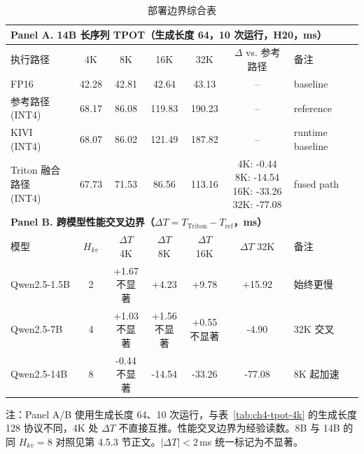 \begin{table}[H]
  \centering
  \caption{部署边界综合表}
  \label{tab:ch4-deployment-boundary}
  {%
	  \scriptsize
	  \setlength{\tabcolsep}{3.0pt}
	  \renewcommand{\arraystretch}{1.14}
		  \begin{tabular*}{\linewidth}{@{\extracolsep{\fill}}lcccccl@{}}
	    \toprule
	    \multicolumn{7}{l}{\textbf{Panel A. 14B 长序列 TPOT（生成长度 64，10 次运行，H20，ms）}} \\
	    \midrule
		    执行路径 & 4K & 8K & 16K & 32K & \makecell[c]{$\Delta$ vs.\\参考路径} & 备注 \\
	    \midrule
		    FP16             & 42.28 & 42.81 & 42.64 & 43.13 & -- & baseline \\
		    \makecell[l]{参考路径\\(INT4)} & 68.17 & 86.08 & 119.83 & 190.23 & -- & reference \\
		    \makecell[l]{KIVI\\(INT4)} & 68.07 & 86.02 & 121.49 & 187.82 & -- & runtime baseline \\
		    \makecell[l]{Triton 融合路径\\(INT4)} & 67.73 & 71.53 & 86.56 & 113.16 & \makecell[c]{4K: -0.44\\8K: -14.54\\16K: -33.26\\32K: -77.08} & fused path \\
	    \midrule
		    \multicolumn{7}{l}{\textbf{Panel B. 跨模型性能交叉边界（$\Delta T=T_{\mathrm{Triton}}-T_{\mathrm{ref}}$，ms）}} \\
	    \midrule
	    模型 & $H_{kv}$ & \makecell[c]{$\Delta T$\\4K} & \makecell[c]{$\Delta T$\\8K} & \makecell[c]{$\Delta T$\\16K} & \makecell[c]{$\Delta T$\\32K} & 备注 \\
    \midrule
    Qwen2.5-1.5B & 2 & \makecell[c]{+1.67\\不显著} & +4.23 & +9.78 & +15.92 & 始终更慢 \\
    Qwen2.5-7B   & 4 & \makecell[c]{+1.03\\不显著} & \makecell[c]{+1.56\\不显著} & \makecell[c]{+0.55\\不显著} & -4.90 & 32K 交叉 \\
    Qwen2.5-14B  & 8 & \makecell[c]{-0.44\\不显著} & -14.54 & -33.26 & -77.08 & 8K 起加速 \\
    \bottomrule
  \end{tabular*}

  \vspace{0.35em}
  \begin{minipage}{0.94\linewidth}
    \footnotesize
    注：Panel A/B 使用生成长度 64、10 次运行，与表~\ref{tab:ch4-tpot-4k} 的生成长度 128 协议不同，4K 处 $\Delta T$ 不直接互推。性能交叉边界为经验读数。8B 与 14B 的同 $H_{kv}=8$ 对照见第 4.5.3 节正文。$|\Delta T|<2$\,ms 统一标记为不显著。

  \end{minipage}
  }
\end{table}

